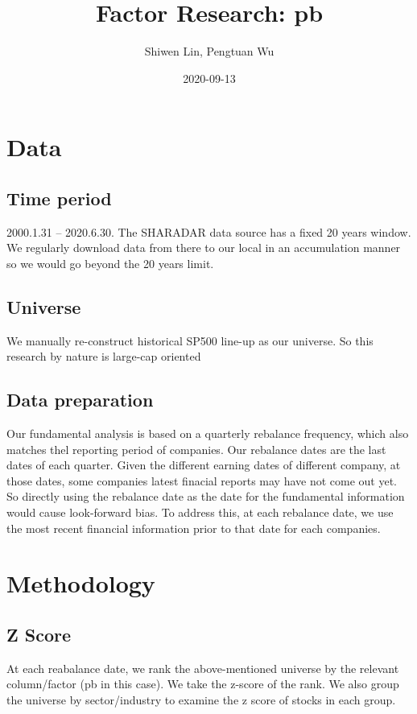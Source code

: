 \documentclass[11pt]{article} %
\title{Factor Research: pb}
\author{Shiwen Lin, Pengtuan Wu}
\date{2020-09-13} %
\begin{document}
\maketitle

\section{Data}

\subsection{Time period}
2000.1.31 – 2020.6.30. The SHARADAR data source has a fixed 20 years window. We regularly download data from there to our local in an accumulation manner so we would go beyond the 20 years limit.

\subsection{Universe}
We manually re-construct historical SP500 line-up as our universe. So this research by nature is large-cap oriented

\subsection{Data preparation}
Our fundamental analysis is based on a quarterly rebalance frequency, which also matches thel reporting period of companies. Our rebalance dates are the last dates of each quarter. Given the different earning dates of different company, at those dates, some companies latest finacial reports may have not come out yet. So directly using the rebalance date as the date for the fundamental information would cause look-forward bias. To address this, at each rebalance date, we use the most recent financial information prior to that date for each companies.

\section{Methodology}
\subsection{Z Score}
At each reabalance date, we rank the above-mentioned universe by the relevant column/factor (pb in this case). We take the z-score of the rank. We also group the universe by sector/industry to examine the z score of stocks in each group.
\end{document}
